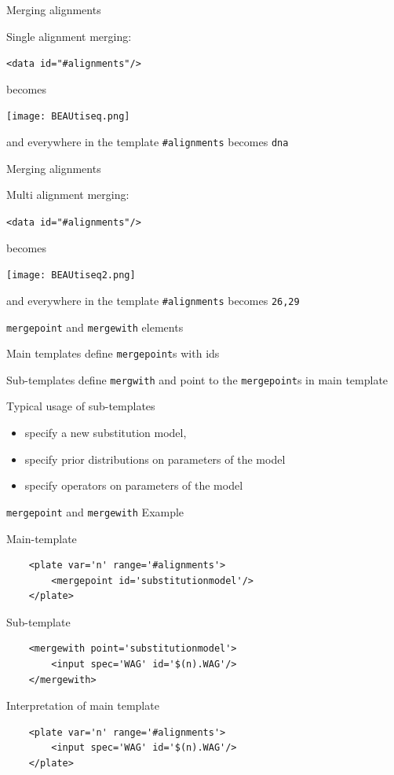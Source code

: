 \documentclass{beamer}
\theoremstyle{definition}
\begin{document}
\begin{frame}[containsverbatim]{Merging alignments}

Single alignment merging:\vskip0.5cm

{\tt <data id="\#alignments"/>}\vskip0.5cm

becomes\vskip0.5cm

\texttt{[image: BEAUtiseq.png]}\vskip0.5cm

and everywhere in the template {\tt \#alignments} becomes {\tt dna}

\end{frame}

\begin{frame}[containsverbatim]{Merging alignments}

Multi alignment merging:\vskip0.5cm

{\tt <data id="\#alignments"/>}\vskip0.5cm

becomes\vskip0.5cm

\texttt{[image: BEAUtiseq2.png]}\vskip0.5cm

and everywhere in the template {\tt \#alignments} becomes {\tt 26,29}

\end{frame}

\begin{frame}[containsverbatim]{{\tt mergepoint} and {\tt mergewith} elements}

Main templates define {\tt mergepoint}s with ids\vskip0.5cm

Sub-templates define {\tt mergwith} and point to the {\tt mergepoint}s in main template\vskip0.5cm

Typical usage of sub-templates
\begin{itemize}
\item specify a new substitution model,
\item specify prior distributions on parameters of the model
\item specify operators on parameters of the model
\end{itemize}
\end{frame}

\begin{frame}[containsverbatim]{{\tt mergepoint} and {\tt mergewith} Example}

Main-template
\begin{verbatim}
    <plate var='n' range='#alignments'>
        <mergepoint id='substitutionmodel'/>
    </plate>
\end{verbatim}


Sub-template
\begin{verbatim}
    <mergewith point='substitutionmodel'>
        <input spec='WAG' id='$(n).WAG'/>
    </mergewith>
\end{verbatim}

Interpretation of main template

\begin{verbatim}
    <plate var='n' range='#alignments'>
        <input spec='WAG' id='$(n).WAG'/>
    </plate>
\end{verbatim}


\end{frame}
\end{document}
